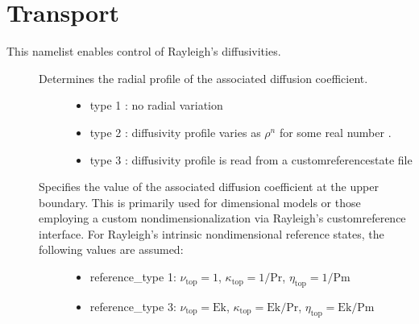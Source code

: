\documentclass[letterpaper,11pt,english]{sphinxmanual}
\begin{document}
\section{Transport}
\label{\detokenize{doc/source/Namelist_Definitions/Namelist_Variables:transport}}
\sphinxAtStartPar
This namelist enables control of Rayleigh’s diffusivities.
\begin{description}
\item[{}] \leavevmode\begin{description}
\item[{Determines the radial profile of the associated diffusion coefficient.}] \leavevmode\begin{itemize}
\item {} 
\sphinxAtStartPar
type 1 : no radial variation

\item {} 
\sphinxAtStartPar
type 2 : diffusivity profile varies as \(\rho^{n}\) for some real number .

\item {} 
\sphinxAtStartPar
type 3 : diffusivity profile is read from a custom\sphinxhyphen{}reference\sphinxhyphen{}state file

\end{itemize}

\end{description}

\item[{}] \leavevmode\begin{description}
\item[{Specifies the value of the associated diffusion coefficient at the upper boundary.  This is primarily used for dimensional models or those employing a custom nondimensionalization via Rayleigh’s custom\sphinxhyphen{}reference interface.   For Rayleigh’s intrinsic nondimensional reference states, the following values are assumed:}] \leavevmode\begin{itemize}
\item {} 
\sphinxAtStartPar
reference\_type 1:  \(\nu_\mathrm{top}=1\), \(\kappa_\mathrm{top}=1/\mathrm{Pr}\), \(\eta_\mathrm{top}=1/\mathrm{Pm}\)

\item {} 
\sphinxAtStartPar
reference\_type 3: \(\nu_\mathrm{top}=\mathrm{Ek}\), \(\kappa_\mathrm{top}=\mathrm{Ek}/\mathrm{Pr}\), \(\eta_\mathrm{top}=\mathrm{Ek}/\mathrm{Pm}\)

\end{itemize}


\end{description}
\end{description}
\end{document}
